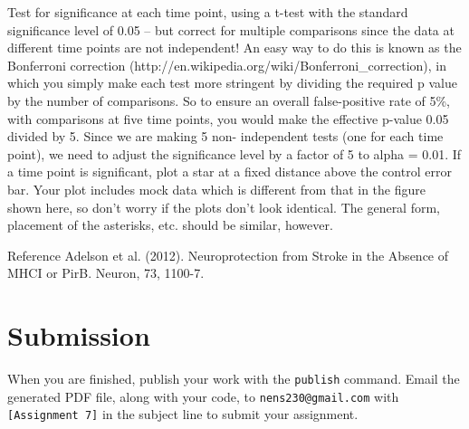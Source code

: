 \documentclass[10pt,letter]{article}
\begin{document}
Test for significance at each time point, using a t-test with the standard significance level of 0.05 – but correct for multiple comparisons since the data at different time points are not independent! An easy way to do this is known as the Bonferroni correction (http://en.wikipedia.org/wiki/Bonferroni\_correction), in which you simply make each test more stringent by dividing the required p value by the number of comparisons. So to ensure an overall false-positive rate of 5\%, with comparisons at five time points, you would make the effective p-value 0.05 divided by 5. Since we are making 5 non- independent tests (one for each time point), we need to adjust the significance level by a factor of 5 to alpha = 0.01. If a time point is significant, plot a star at a fixed distance above the control error bar.  Your plot includes mock data which is different from that in the figure shown here, so don't worry if the plots don't look identical.  The general form, placement of the asterisks, etc. should be similar, however.  

Reference
Adelson et al. (2012). Neuroprotection from Stroke in the Absence of MHCI or PirB. Neuron, 73, 1100-7. 

\section*{Submission}
When you are finished, publish your work with the \texttt{publish} command. Email the generated PDF file, along with your code, to \texttt{nens230@gmail.com} with \texttt{[Assignment 7]} in the subject line to submit your assignment.
\end{document}
